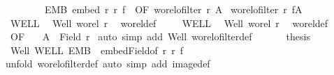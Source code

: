 \begin{isabellebody}
\ \ \ \ \ \ \ \ EMB{\isacharcolon}{\kern0pt}\ {\isachardoublequoteopen}embed\ r\ r{\isacharprime}{\kern0pt}\ f{\isachardoublequoteclose}\ \ OF{\isacharcolon}{\kern0pt}\ {\isachardoublequoteopen}wo{\isacharunderscore}{\kern0pt}rel{\isachardot}{\kern0pt}ofilter\ r\ A{\isachardoublequoteclose}\isanewline
{}\ {\isachardoublequoteopen}wo{\isacharunderscore}{\kern0pt}rel{\isachardot}{\kern0pt}ofilter\ r{\isacharprime}{\kern0pt}\ {\isacharparenleft}{\kern0pt}f{\isacharbackquote}{\kern0pt}A{\isacharparenright}{\kern0pt}{\isachardoublequoteclose}\isanewline
%
\isadelimproof
%
\endisadelimproof
%
\isatagproof
{}\isamarkupfalse%
{\isacharminus}{\kern0pt}\isanewline
\ \ \isanewline
\ \ \isamarkupfalse%
\ WELL\ \isamarkupfalse%
\ Well{\isacharcolon}{\kern0pt}\ {\isachardoublequoteopen}wo{\isacharunderscore}{\kern0pt}rel\ r{\isachardoublequoteclose}\ \isamarkupfalse%
\ wo{\isacharunderscore}{\kern0pt}rel{\isacharunderscore}{\kern0pt}def\ \isacommand{{\isachardot}{\kern0pt}}\isamarkupfalse%
\isanewline
\ \ \isamarkupfalse%
\ WELL{\isacharprime}{\kern0pt}\ \isamarkupfalse%
\ Well{\isacharprime}{\kern0pt}{\isacharcolon}{\kern0pt}\ {\isachardoublequoteopen}wo{\isacharunderscore}{\kern0pt}rel\ r{\isacharprime}{\kern0pt}{\isachardoublequoteclose}\ \isamarkupfalse%
\ wo{\isacharunderscore}{\kern0pt}rel{\isacharunderscore}{\kern0pt}def\ \isacommand{{\isachardot}{\kern0pt}}\isamarkupfalse%
\isanewline
\ \ \isamarkupfalse%
\ OF\ \isamarkupfalse%
\ {}{\isacharcolon}{\kern0pt}\ {\isachardoublequoteopen}A\ {\isasymle}\ Field\ r{\isachardoublequoteclose}\ \isamarkupfalse%
{\isacharparenleft}{\kern0pt}auto\ simp\ add{\isacharcolon}{\kern0pt}\ Well\ wo{\isacharunderscore}{\kern0pt}rel{\isachardot}{\kern0pt}ofilter{\isacharunderscore}{\kern0pt}def{\isacharparenright}{\kern0pt}\isanewline
\ \ \isanewline
\ \ \isamarkupfalse%
\ {\isacharquery}{\kern0pt}thesis\ \ \isamarkupfalse%
\ Well{\isacharprime}{\kern0pt}\ WELL\ EMB\ {}\ embed{\isacharunderscore}{\kern0pt}Field{\isacharbrackleft}{\kern0pt}of\ r\ r{\isacharprime}{\kern0pt}\ f{\isacharbrackright}{\kern0pt}\isanewline
\ \ \isamarkupfalse%
{\isacharparenleft}{\kern0pt}unfold\ wo{\isacharunderscore}{\kern0pt}rel{\isachardot}{\kern0pt}ofilter{\isacharunderscore}{\kern0pt}def{\isacharcomma}{\kern0pt}\ auto\ simp\ add{\isacharcolon}{\kern0pt}\ image{\isacharunderscore}{\kern0pt}def{\isacharparenright}{\kern0pt}\isanewline

\end{isabellebody}

